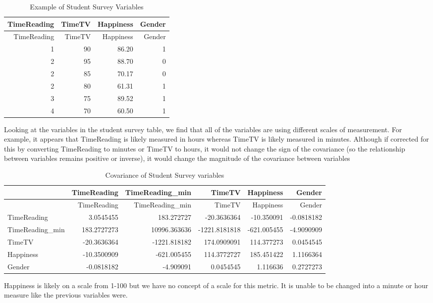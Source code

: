 \documentclass[
]{article}
\begin{document}
\begin{longtable}[]{@{}rrrr@{}}
\caption{Example of Student Survey Variables}\tabularnewline
\toprule
TimeReading & TimeTV & Happiness & Gender \\
\midrule
\endfirsthead
\toprule
TimeReading & TimeTV & Happiness & Gender \\
\midrule
\endhead
1 & 90 & 86.20 & 1 \\
2 & 95 & 88.70 & 0 \\
2 & 85 & 70.17 & 0 \\
2 & 80 & 61.31 & 1 \\
3 & 75 & 89.52 & 1 \\
4 & 70 & 60.50 & 1 \\
\bottomrule
\end{longtable}

Looking at the variables in the student survey table, we find that all
of the variables are using different scales of measurement. For example,
it appears that TimeReading is likely measured in hours whereas TimeTV
is likely measured in minutes. Although if corrected for this by
converting TimeReading to minutes or TimeTV to hours, it would not
change the sign of the covariance (so the relationship between variables
remains positive or inverse), it would change the magnitude of the
covariance between variables

\begin{longtable}[]{@{}lrrrrr@{}}
\caption{Covariance of Student Survey variables}\tabularnewline
\toprule
& TimeReading & TimeReading\_min & TimeTV & Happiness & Gender \\
\midrule
\endfirsthead
\toprule
& TimeReading & TimeReading\_min & TimeTV & Happiness & Gender \\
\midrule
\endhead
TimeReading & 3.0545455 & 183.272727 & -20.3636364 & -10.350091 &
-0.0818182 \\
TimeReading\_min & 183.2727273 & 10996.363636 & -1221.8181818 &
-621.005455 & -4.9090909 \\
TimeTV & -20.3636364 & -1221.818182 & 174.0909091 & 114.377273 &
0.0454545 \\
Happiness & -10.3500909 & -621.005455 & 114.3772727 & 185.451422 &
1.1166364 \\
Gender & -0.0818182 & -4.909091 & 0.0454545 & 1.116636 & 0.2727273 \\
\bottomrule
\end{longtable}

Happiness is likely on a scale from 1-100 but we have no concept of a
scale for this metric. It is unable to be changed into a minute or hour
measure like the previous variables were.
\end{document}
